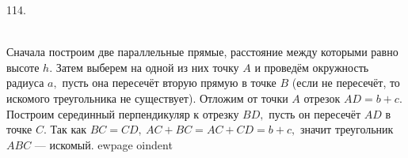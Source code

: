 114. \begin{figure}[ht!]
\end{figure}\\
Сначала построим две параллельные прямые, расстояние между которыми равно высоте $h.$ Затем выберем на одной из них точку $A$ и проведём окружность радиуса $a,$ пусть она пересечёт вторую прямую в точке $B$ (если не пересечёт, то искомого треугольника не существует). Отложим от точки $A$ отрезок $AD=b+c.$ Построим серединный перпендикуляр к отрезку $BD,$ пусть он пересечёт $AD$ в точке $C.$ Так как $BC=CD,\ AC+BC=AC+CD=b+c,$ значит треугольник $ABC$ --- искомый.
ewpage
oindent
